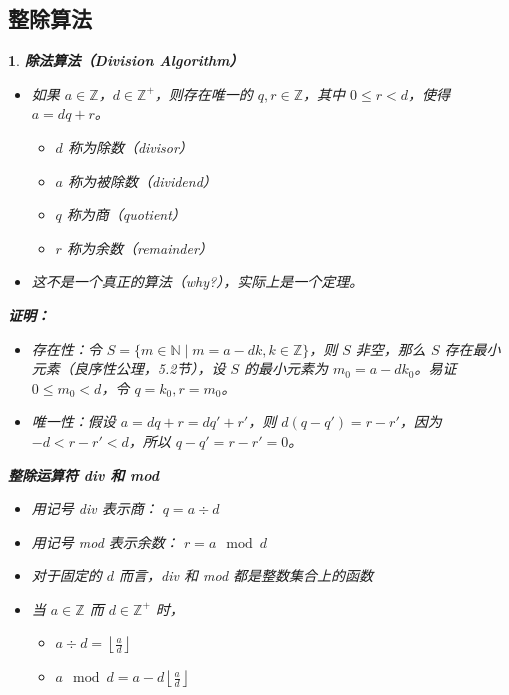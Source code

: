 \documentclass[UTF8]{report}
\theoremstyle{MyLineTheoremStyle} %
\theoremstyle{MyBlockTheoremStyle} %
\theoremstyle{MySubsubsectionStyle} %
\newtheorem{definition}{}
\begin{document}
\subsection{整除算法}

\begin{definition}
    \textbf{除法算法（Division Algorithm）}
    \begin{itemize}
        \item 如果 $a \in \mathbb{Z}$，$d \in \mathbb{Z}^+$，则存在唯一的 $q, r \in \mathbb{Z}$，其中 $0 \leq r < d$，使得 $a = dq + r$。
        \begin{itemize}
            \item $d$ 称为除数（divisor）
            \item $a$ 称为被除数（dividend）
            \item $q$ 称为商（quotient）
            \item $r$ 称为余数（remainder）
        \end{itemize}
        \item 这不是一个真正的算法（why?），实际上是一个定理。
    \end{itemize}

    \textbf{证明：}
    \begin{itemize}
        \item 存在性：令 $S = \{m \in \mathbb{N} \mid m = a - dk, k \in \mathbb{Z}\}$，则 $S$ 非空，那么 $S$ 存在最小元素（良序性公理，5.2节），设 $S$ 的最小元素为 $m_0 = a - dk_0$。易证 $0 \leq m_0 < d$，令 $q = k_0, r = m_0$。
        \item 唯一性：假设 $a = dq + r = dq' + r'$，则 $d(q - q') = r - r'$，因为 $-d < r - r' < d$，所以 $q - q' = r - r' = 0$。
    \end{itemize}

    \textbf{整除运算符 div 和 mod}
    \begin{itemize}
        \item 用记号 div 表示商： $q = a \div d$
        \item 用记号 mod 表示余数： $r = a \mod d$
        \item 对于固定的 $d$ 而言，div 和 mod 都是整数集合上的函数
        \item 当 $a \in \mathbb{Z}$ 而 $d \in \mathbb{Z}^+$ 时，
        \begin{itemize}
            \item $a \div d = \left\lfloor \frac{a}{d} \right\rfloor$
            \item $a \mod d = a - d \left\lfloor \frac{a}{d} \right\rfloor$
        \end{itemize}
    \end{itemize}
\end{definition}
\end{document}
